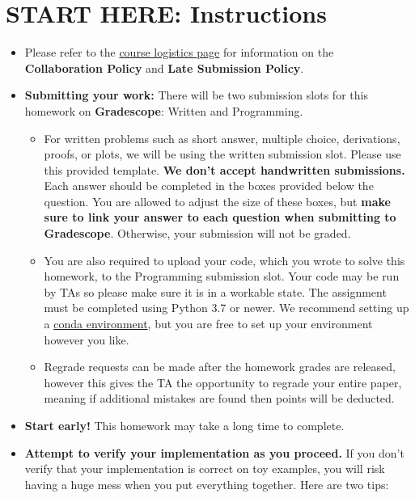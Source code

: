 \documentclass[11pt]{article}
\numberwithin{equation}{section} %
\numberwithin{figure}{section} %
\numberwithin{table}{section} %
\begin{document}
\section*{START HERE: Instructions}
\begin{itemize}
\item Please refer to the \href{https://canvas.cmu.edu/courses/32966/pages/logistics}{course logistics page} for information on the \textbf{Collaboration Policy} and \textbf{Late Submission Policy}.


\item\textbf{Submitting your work:} There will be two submission slots for this homework on \textbf{Gradescope}: Written and Programming. 

\begin{itemize}

\item 
For written problems such as short answer, multiple choice, derivations, proofs, or plots, we will be using the written submission slot. Please use this provided template. \textbf{We don't accept handwritten submissions.}  Each answer should be completed in the boxes provided below the question. You are allowed to adjust the size of these boxes, but \textbf{make sure to link your answer to each question when submitting to Gradescope}. Otherwise, your submission will not be graded.
\item
You are also required to upload your code, which you wrote to solve this homework, to the Programming submission slot. Your code may be run by TAs so please make sure it is in a workable state. The assignment must be completed using Python 3.7 or newer. We recommend setting up a \href{https://docs.conda.io/projects/conda/en/latest/user-guide/index.html}{conda environment}, but you are free to set up your environment however you like. 
\item
Regrade requests can be made after the homework grades are released, however this gives the TA the opportunity to regrade your entire paper, meaning if additional mistakes are found then points will be deducted. 
\end{itemize}

\item {\bf Start early!} This homework may take a long time to complete.

\item {\bf Attempt to verify your implementation as you proceed.} If you don't verify that your implementation is correct on toy examples, you will risk having a huge mess when you put everything together. Here are two tips:


\end{itemize}
\end{document}
